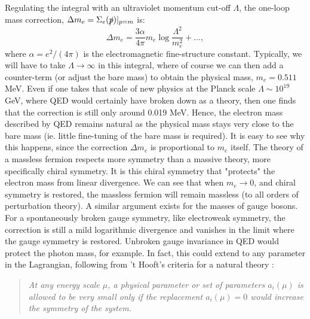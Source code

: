 \begin{itemize}
Regulating the integral with an ultraviolet momentum cut-off $\Lambda$, the one-loop mass correction, $\Delta m_e=\Sigma_{e}(\slashed{p})|_{p=m}$ is:
\begin{equation}
\Delta m_{e}=\frac{3\alpha}{4\pi}m_{e}\log\frac{\Lambda^2}{m^2_e}+... ,
\end{equation}
where $\alpha=e^2/(4\pi)$ is the electromagnetic fine-structure constant. Typically, we will have to take $\Lambda \rightarrow \infty$ in this integral, where of course we can then add a counter-term (or adjust the bare mass) to obtain the physical mass, $m_e=0.511$ MeV. Even if one takes that scale of new physics at the Planck scale $\Lambda \sim 10^{19}$ GeV, where QED would certainly have broken down as a theory, then one finds that the correction is still only around 0.019 MeV. Hence, the electron mass described by QED remains natural as the physical mass stays very close to the bare mass (ie. little fine-tuning of the bare mass is required). It is easy to see why this happens, since the correction $\Delta m_{e}$ is proportional to $m_e$ itself. The theory of a massless fermion respects more symmetry than a massive theory, more specifically chiral symmetry. It is this chiral symmetry that "protects" the electron mass from linear divergence. We can see that when $m_e \rightarrow 0$, and chiral symmetry is restored, the massless fermion will remain massless (to all orders of perturbation theory). A similar argument exists for the masses of gauge bosons. For a spontaneously broken gauge symmetry, like electroweak symmetry, the correction is still a mild logarithmic divergence and vanishes in the limit where the gauge symmetry is restored. Unbroken gauge invariance in QED would protect the photon mass, for example. In fact, this could extend to any parameter in the Lagrangian, following from 't Hooft's criteria for a natural theory \cite{RN518}:

\blockquote{\textit{At any energy scale $\mu$, a physical parameter or set of parameters $a_{i}(\mu)$ is allowed to be very small only if the replacement $a_{i}(\mu)=0$ would increase the symmetry of the system.}}


\end{itemize}
